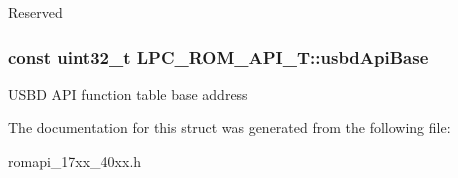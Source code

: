 Reserved \hypertarget{struct_l_p_c___r_o_m___a_p_i___t_a94bc8146ba697eeadc992d4985971550}{
\subsubsection[{usbd\+Api\+Base}]{\setlength{\rightskip}{0pt plus 5cm}const uint32\+\_\+t L\+P\+C\+\_\+\+R\+O\+M\+\_\+\+A\+P\+I\+\_\+\+T\+::usbd\+Api\+Base}}\label{struct_l_p_c___r_o_m___a_p_i___t_a94bc8146ba697eeadc992d4985971550}
U\+S\+B\+D A\+P\+I function table base address 

The documentation for this struct was generated from the following file\+:\begin{DoxyCompactItemize}
\item 
romapi\+\_\+17xx\+\_\+40xx.\+h\end{DoxyCompactItemize}
